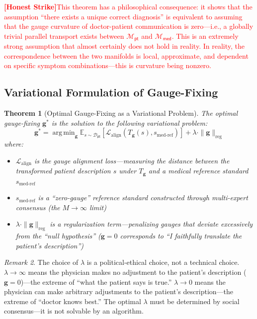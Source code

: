 \documentclass[12pt,a4paper]{article}
\newtheorem{theorem}{Theorem}[section]
\theoremstyle{remark}
\newtheorem{remark}[theorem]{Remark}
\newcommand{\med}{\textsf{med}}
\newcommand{\pt}{\textsf{pt}}
\DeclareMathOperator{\argmin}{arg\,min}
\newcommand{\honestcrit}[1]{%
    \textcolor{red}{\textbf{[Honest Strike]}#1}%
}
\begin{document}
\honestcrit{This theorem has a philosophical consequence: it shows that the assumption ``there exists a unique correct diagnosis'' is equivalent to assuming that the gauge curvature of doctor-patient communication is zero---i.e., a globally trivial parallel transport exists between $\mathcal{M}_{\pt}$ and $\mathcal{M}_{\med}$. This is an extremely strong assumption that almost certainly does not hold in reality. In reality, the correspondence between the two manifolds is local, approximate, and dependent on specific symptom combinations---this is curvature being nonzero.}

\subsection{Variational Formulation of Gauge-Fixing}

\begin{theorem}[Optimal Gauge-Fixing as a Variational Problem]\label{thm:variational_gauge}
The optimal gauge-fixing $\mathbf{g}^*$ is the solution to the following variational problem:
\begin{equation}
    \mathbf{g}^* = \argmin_{\mathbf{g}} \mathbb{E}_{s \sim \mathcal{D}_{\pt}} \left[ \mathcal{L}_{\text{align}}(T_{\mathbf{g}}(s), s_{\text{med-ref}}) \right] + \lambda \cdot \|\mathbf{g}\|_{\text{reg}}
\end{equation}
where:
\begin{itemize}
    \item $\mathcal{L}_{\text{align}}$ is the gauge alignment loss---measuring the distance between the transformed patient description $s$ under $T_{\mathbf{g}}$ and a medical reference standard $s_{\text{med-ref}}$
    \item $s_{\text{med-ref}}$ is a ``zero-gauge'' reference standard constructed through multi-expert consensus (the $M \to \infty$ limit)
    \item $\lambda \cdot \|\mathbf{g}\|_{\text{reg}}$ is a regularization term---penalizing gauges that deviate excessively from the ``null hypothesis'' ($\mathbf{g}=0$ corresponds to ``I faithfully translate the patient's description'')
\end{itemize}
\end{theorem}

\begin{remark}
The choice of $\lambda$ is a political-ethical choice, not a technical choice. $\lambda \to \infty$ means the physician makes no adjustment to the patient's description ($\mathbf{g}=0$)---the extreme of ``what the patient says is true.'' $\lambda \to 0$ means the physician can make arbitrary adjustments to the patient's description---the extreme of ``doctor knows best.'' The optimal $\lambda$ must be determined by social consensus---it is not solvable by an algorithm.
\end{remark}
\end{document}
